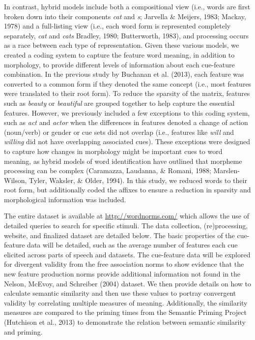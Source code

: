 \documentclass[english,,man]{apa6}
\begin{document}
In contrast, hybrid models include both a compositional view (i.e., words are first broken down into their components \emph{cat} and \emph{s}; Jarvella \& Meijers, 1983; Mackay, 1978) and a full-listing view (i.e., each word form is represented completely separately, \emph{cat} and \emph{cats} Bradley, 1980; Butterworth, 1983), and processing occurs as a race between each type of representation. Given these various models, we created a coding system to capture the feature word meaning, in addition to morphology, to provide different levels of information about each cue-feature combination. In the previous study by Buchanan et al. (2013), each feature was converted to a common form if they denoted the same concept (i.e., most features were translated to their root form). To reduce the sparsity of the matrix, features such as \emph{beauty} or \emph{beautiful} are grouped together to help capture the essential features. However, we previously included a few exceptions to this coding system, such as \emph{act} and \emph{actor} when the differences in features denoted a change of action (noun/verb) or gender or cue sets did not overlap (i.e., features like \emph{will} and \emph{willing} did not have overlapping associated cues). These exceptions were designed to capture how changes in morphology might be important cues to word meaning, as hybrid models of word identification have outlined that morpheme processing can be complex (Caramazza, Laudanna, \& Romani, 1988; Marslen-Wilson, Tyler, Waksler, \& Older, 1994). In this study, we reduced words to their root form, but additionally coded the affixes to ensure a reduction in sparsity and morphological information was included.

The entire dataset is available at \url{http://wordnorms.com/} which allows the use of detailed queries to search for specific stimuli. The data collection, (re)processing, website, and finalized dataset are detailed below. The basic properties of the cue-feature data will be detailed, such as the average number of features each cue elicited across parts of speech and datasets. The cue-feature data will be explored for divergent validity from the free association norms to show evidence that the new feature production norms provide additional information not found in the Nelson, McEvoy, and Schreiber (2004) dataset. We then provide details on how to calculate semantic similarity and then use these values to portray convergent validity by correlating multiple measures of meaning. Additionally, the similarity measures are compared to the priming times from the Semantic Priming Project (Hutchison et al., 2013) to demonstrate the relation between semantic similarity and priming.
\end{document}
